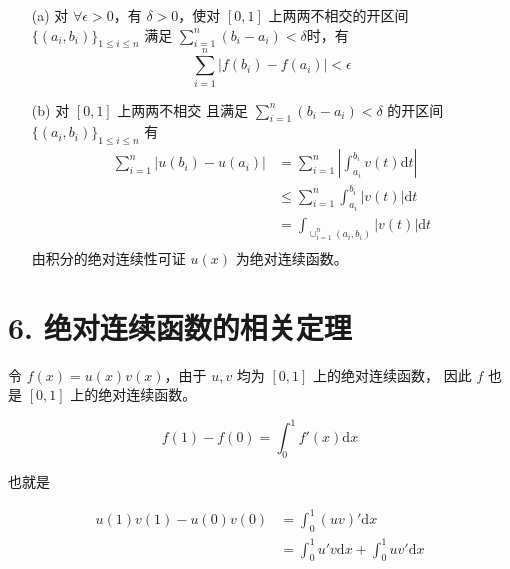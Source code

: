 \documentclass[a4paper]{article}
\begin{document}
\begin{enumerate}
    \item[(a)] 对 $\forall \epsilon>0$，有 $\delta>0$，使对 $[0,1]$
                上两两不相交的开区间 $\{(a_i,b_i)\}_{1\leq i \leq n}$ 满足
                $\sum_{i=1}^{n} (b_i - a_i) < \delta$时，有
                \begin{equation}
                    \sum_{i=1}^{n} |f(b_i) - f(a_i)| < \epsilon
                \end{equation}
    \item[(b)] 对 $[0,1]$ 上两两不相交
                且满足 $\sum_{i=1}^{n} (b_i - a_i) < \delta$ 的开区间 $\{(a_i,b_i)\}_{1\leq i \leq n}$ 有
                \begin{equation}
                    \begin{aligned}
                        \sum_{i=1}^{n} |u(b_i) - u(a_i)|
                        &= \sum_{i=1}^{n} \left|
                            \int_{a_i}^{b_i} v(t) \text{d}t
                        \right|\\
                        &\leq \sum_{i=1}^{n} 
                            \int_{a_i}^{b_i} |v(t)| \text{d}t\\
                        &= \int_{\cup_{i=1}^{n}(a_i, b_i) } |v(t)| \text{d}t\\
                    \end{aligned}
                \end{equation} 
                由积分的绝对连续性可证 $u(x)$ 为绝对连续函数。             
\end{enumerate}

\section*{6. 绝对连续函数的相关定理}

令 $f(x) = u(x) v(x)$，由于 $u, v$ 均为 $[0,1]$ 上的绝对连续函数，
因此 $f$ 也是 $[0,1]$ 上的绝对连续函数。

\begin{equation}
    f(1) - f(0) = \int_{0}^{1} f'(x) \text{d}x
\end{equation}

也就是

\begin{equation}
    \begin{aligned}
        u(1)v(1) - u(0)v(0)
        &= \int_{0}^{1} (uv)' \text{d}x\\
        &= \int_{0}^{1} u'v \text{d}x
            + \int_{0}^{1} uv' \text{d}x
    \end{aligned}
\end{equation}
\end{document}
